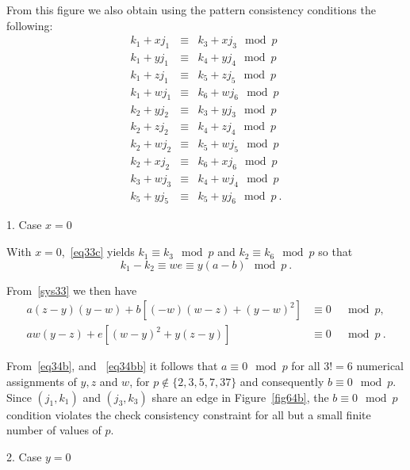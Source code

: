  From this figure we also obtain using the pattern
 consistency conditions the following:
\begin{equation}\label{eq33c}\begin{array}{cccc}
k_1+xj_1 & \equiv & k_3+xj_3 \mod p\\
k_1+yj_1 & \equiv & k_4+yj_4 \mod p\\
k_1+zj_1 & \equiv & k_5+zj_5 \mod p\\
k_1+wj_1 & \equiv & k_6+wj_6 \mod p\\
k_2+yj_2 & \equiv & k_3+yj_3 \mod p\\
k_2+zj_2 & \equiv & k_4+zj_4 \mod p\\
k_2+wj_2 & \equiv & k_5+wj_5 \mod p\\
k_2+xj_2 & \equiv & k_6+xj_6 \mod p\\
k_3+wj_3 & \equiv & k_4+wj_4 \mod p\\
k_5+yj_5 & \equiv & k_5+yj_6 \mod p~.
\end{array}\end{equation}

1. Case $x=0$

With $x=0$,~\eqref{eq33c} yields $k_1 \equiv k_3 \mod p$ and $k_2
\equiv k_6 \mod p$ so that
\begin{equation}\label{eq34b}
k_1 -k_2 \equiv we \equiv y(a-b) \mod p~.
\end{equation}


From~\eqref{sys33} we then have
\begin{equation}\label{eq34bb}\begin{array}{cccc}
a(z-y)(y-w)+b[(-w)(w-z)+(y-w)^2 ] &\equiv 0& \mod p,\\
aw(y-z)+e[(w-y)^2+y(z-y)] &\equiv 0& \mod p~.
\end{array}\end{equation}

From~\eqref{eq34b}, and ~\eqref{eq34bb} it follows that $a \equiv 0
\mod p$ for all $3!=6$ numerical assignments of $y,z$ and $w$, for
$p\notin \{2,3,5,7,37\}$ and consequently $b \equiv 0 \mod p$. Since
$(j_1,k_1)$ and $(j_3,k_3)$ share an edge in Figure~\ref{fig64b},
the $b \equiv 0 \mod p$ condition violates the check consistency
constraint for all but a small finite number of values of $p$.

2. Case $y=0$

